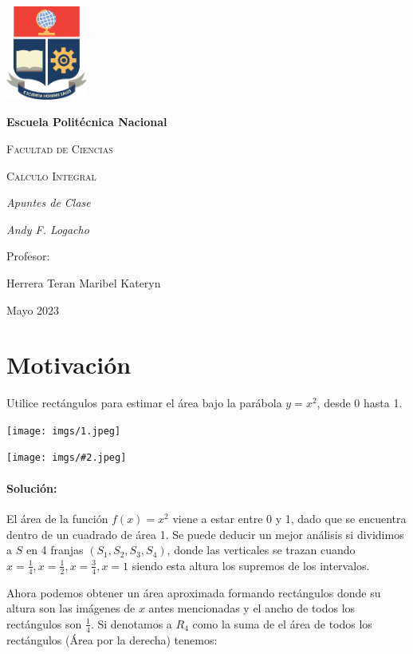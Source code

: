 \documentclass{article}
\newcommand{\ig}[2]{\begin{minipage}[c]{#1cm}
    \texttt{[image: imgs/\#2.jpeg]}
\end{minipage}}
\newcommand{\xo}[1]{\paragraph*{#1}}
\begin{document}
\begin{titlepage}
    \centering
    {\includegraphics[width=0.2\textwidth]{Logo_EPN.eps}\par}
    \vspace{1cm}
    {\bfseries\LARGE Escuela Politécnica Nacional \par}
    \vspace{1cm}
    {\scshape\Large Facultad de Ciencias \par}
    \vspace{3cm}
    {\scshape\Huge Calculo Integral \par}
    {\itshape\Large Apuntes de Clase \par}
    \vfill
    {\itshape\Large Andy F. Logacho \par}
    \vfill
    {\Large Profesor:  \par}
    {\Large Herrera Teran Maribel Kateryn\par}
    \vfill
    {\Large Mayo 2023 \par}
\end{titlepage}
\newpage

\section*{Motivación}
Utilice rectángulos para estimar el área bajo la parábola $y=x^2$, desde 0 hasta 1.

\begin{minipage}[c]{5cm}
    \texttt{[image: imgs/1.jpeg]}
\end{minipage}
\ig{12}{2}

\xo{Solución:}El área de la función $f(x)=x^2$ viene a estar entre 0 y 1, dado que se encuentra dentro de un cuadrado de área 1. 
Se puede deducir un mejor análisis si dividimos a $S$ en 4 franjas $(S_1,S_2,S_3,S_4)$, donde las verticales se trazan cuando 
$x=\frac{1}{4},x=\frac{1}{2},x=\frac{3}{4},x=1$ siendo esta altura los supremos de los intervalos. 

Ahora podemos obtener un área aproximada formando rectángulos donde su altura son las imágenes de $x$ antes mencionadas y el ancho de todos 
los rectángulos son $\frac{1}{4}$. Si denotamos a $R_4$ como la suma de el área de todos los rectángulos (Área por la derecha) tenemos:
\end{document}

